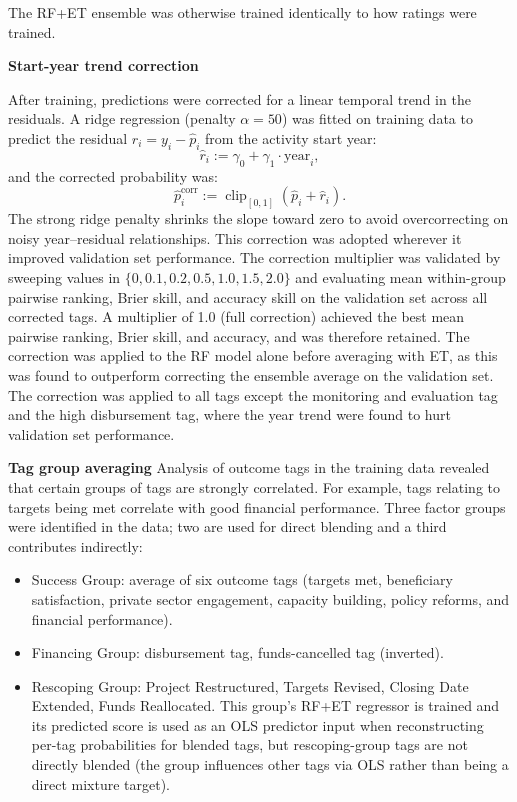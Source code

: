 The RF+ET ensemble was otherwise trained identically to how ratings were trained. 


\textbf{Start-year trend correction}

After training, predictions were corrected for a linear temporal trend in the residuals.
A ridge regression (penalty $\alpha=50$) was fitted on training data to predict the residual $r_i = y_i - \hat{p}_i$ from the activity start year:
\[
\hat{r}_i := \gamma_0 + \gamma_1 \cdot \text{year}_i ,
\]
and the corrected probability was:
\[
\hat{p}^{\text{corr}}_i := \operatorname{clip}_{[0,1]}\!\left(\hat{p}_i + \hat{r}_i\right).
\]
The strong ridge penalty shrinks the slope toward zero to avoid overcorrecting on noisy year--residual relationships. This correction was adopted wherever it improved validation set performance.
The correction multiplier was validated by sweeping values in $\{0, 0.1, 0.2, 0.5, 1.0, 1.5, 2.0\}$ and evaluating mean within-group pairwise ranking, Brier skill, and accuracy skill on the validation set across all corrected tags. A multiplier of 1.0 (full correction) achieved the best mean pairwise ranking, Brier skill, and accuracy, and was therefore retained. The correction was applied to the RF model alone before averaging with ET, as this was found to outperform correcting the ensemble average on the validation set. The correction was applied to all tags except the monitoring and evaluation tag and the high disbursement tag, where the year trend were found to hurt validation set performance.


\textbf{Tag group averaging}
Analysis of outcome tags in the training data revealed that certain groups of tags are strongly correlated. For example, tags relating to targets being met correlate with good financial performance. Three factor groups were identified in the data; two are used for direct blending and a third contributes indirectly:

\begin{itemize}
    \item Success Group: average of six outcome tags (targets met,  beneficiary satisfaction, private sector engagement, capacity building, policy reforms,  and financial performance).
    \item Financing Group: disbursement tag, funds-cancelled tag (inverted).
    \item Rescoping Group: Project Restructured, Targets Revised, Closing Date Extended, Funds Reallocated. This group's RF+ET regressor is trained and its predicted score is used as an OLS predictor input when reconstructing per-tag probabilities for blended tags, but rescoping-group tags are not directly blended (the group influences other tags via OLS rather than being a direct mixture target).
\end{itemize}

